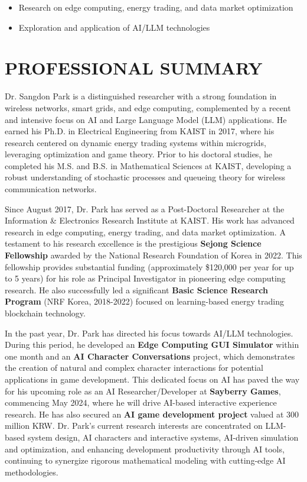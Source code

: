 \documentclass[11pt,a4paper]{article}
\begin{document}
\begin{itemize}
    \item Research on edge computing, energy trading, and data market optimization
    \item Exploration and application of AI/LLM technologies
\end{itemize}

\section{PROFESSIONAL SUMMARY}

Dr. Sangdon Park is a distinguished researcher with a strong foundation in wireless networks, smart grids, and edge computing, complemented by a recent and intensive focus on AI and Large Language Model (LLM) applications. He earned his Ph.D. in Electrical Engineering from KAIST in 2017, where his research centered on dynamic energy trading systems within microgrids, leveraging optimization and game theory. Prior to his doctoral studies, he completed his M.S. and B.S. in Mathematical Sciences at KAIST, developing a robust understanding of stochastic processes and queueing theory for wireless communication networks.

Since August 2017, Dr. Park has served as a Post-Doctoral Researcher at the Information \& Electronics Research Institute at KAIST. His work has advanced research in edge computing, energy trading, and data market optimization. A testament to his research excellence is the prestigious \textbf{Sejong Science Fellowship} awarded by the National Research Foundation of Korea in 2022. This fellowship provides substantial funding (approximately \$120,000 per year for up to 5 years) for his role as Principal Investigator in pioneering edge computing research. He also successfully led a significant \textbf{Basic Science Research Program} (NRF Korea, 2018-2022) focused on learning-based energy trading blockchain technology.

In the past year, Dr. Park has directed his focus towards AI/LLM technologies. During this period, he developed an \textbf{Edge Computing GUI Simulator} within one month and an \textbf{AI Character Conversations} project, which demonstrates the creation of natural and complex character interactions for potential applications in game development. This dedicated focus on AI has paved the way for his upcoming role as an AI Researcher/Developer at \textbf{Sayberry Games}, commencing May 2024, where he will drive AI-based interactive experience research. He has also secured an \textbf{AI game development project} valued at 300 million KRW. Dr. Park's current research interests are concentrated on LLM-based system design, AI characters and interactive systems, AI-driven simulation and optimization, and enhancing development productivity through AI tools, continuing to synergize rigorous mathematical modeling with cutting-edge AI methodologies.
\end{document}
